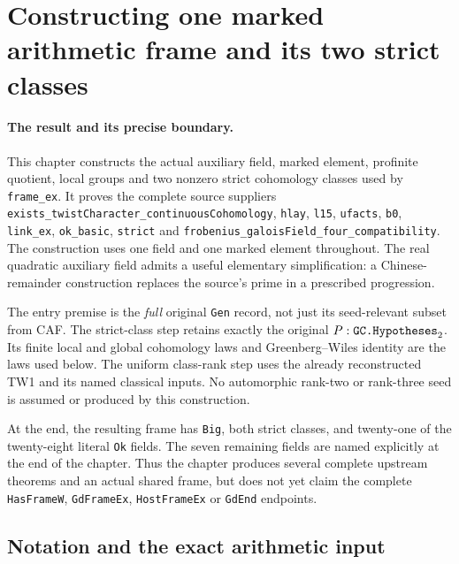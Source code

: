 \documentclass[11pt,a4paper]{article}
\numberwithin{equation}{section}
\theoremstyle{remark}\newtheorem{remark}[theorem]{Remark}
\begin{document}
\section{Constructing one marked arithmetic frame and its two strict classes}
\label{sec:marked-frame-construction}

\paragraph{The result and its precise boundary.}
This chapter constructs the actual auxiliary field, marked element,
profinite quotient, local groups and two nonzero strict cohomology
classes used by \texttt{frame\_\allowbreak ex}.  It proves the complete source
suppliers \texttt{exists\_\allowbreak twist\allowbreak Character\_\allowbreak continuous\allowbreak Cohomology},
\texttt{hlay}, \texttt{l15}, \texttt{ufacts}, \texttt{b0},
\texttt{link\_\allowbreak ex}, \texttt{ok\_\allowbreak basic}, \texttt{strict} and
\texttt{frobenius\_\allowbreak galois\allowbreak Field\_\allowbreak four\_\allowbreak compatibility}.
The construction uses one field and one marked element throughout.
The real quadratic auxiliary field admits a useful elementary
simplification: a Chinese-remainder construction replaces the
source's prime in a prescribed progression.

The entry premise is the \emph{full} original \texttt{Gen} record,
not just its seed-relevant subset from CAF.  The strict-class step
retains exactly the original \(P:\texttt{GC.\allowbreak Hypotheses}_{2}\).
Its finite local and global cohomology laws and Greenberg--Wiles
identity are the laws used below.  The uniform class-rank step
uses the already reconstructed TW1 and its named classical inputs.
No automorphic rank-two or rank-three seed is assumed or produced
by this construction.

At the end, the resulting frame has \texttt{Big}, both strict
classes, and twenty-one of the twenty-eight literal \texttt{Ok}
fields.  The seven remaining fields are named explicitly at the
end of the chapter.  Thus the chapter produces several complete
upstream theorems and an actual shared frame, but does not yet
claim the complete \texttt{Has\allowbreak Frame\allowbreak W}, \texttt{Gd\allowbreak Frame\allowbreak Ex},
\texttt{Host\allowbreak Frame\allowbreak Ex} or \texttt{Gd\allowbreak End} endpoints.

\subsection{Notation and the exact arithmetic input}
\end{document}
